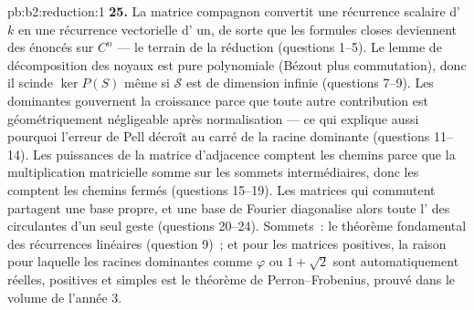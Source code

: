 \begin{solution}{pb:b2:reduction:1}
\textbf{25.} La matrice compagnon convertit une récurrence scalaire
d' $k$ en une récurrence vectorielle d' un, de sorte que les
formules closes deviennent des énoncés sur $C^n$ --- le terrain de la
réduction (questions 1--5). Le lemme de décomposition des noyaux est
pure  polynomiale (Bézout plus commutation), donc il scinde
$\ker P(S)$ même si $\mathcal{S}$ est de dimension infinie
(questions 7--9). Les  dominantes gouvernent la
croissance parce que toute autre contribution est géométriquement
négligeable après normalisation --- ce qui explique aussi pourquoi
l'erreur de Pell décroît au carré de la racine dominante
(questions 11--14). Les puissances de la matrice d'adjacence comptent
les chemins parce que la multiplication matricielle somme sur les
sommets intermédiaires, donc les  comptent les chemins fermés
(questions 15--19). Les matrices qui commutent partagent une base
propre, et une base de Fourier diagonalise alors toute l' des
circulantes d'un seul geste (questions 20--24). Sommets~: le théorème
fondamental des récurrences linéaires (question 9)~; et pour les
matrices positives, la raison pour laquelle les racines dominantes
comme $\varphi$ ou $1 + \sqrt2$ sont automatiquement réelles,
positives et simples est le théorème de Perron--Frobenius, prouvé dans
le volume de l'année 3.
\end{solution}

